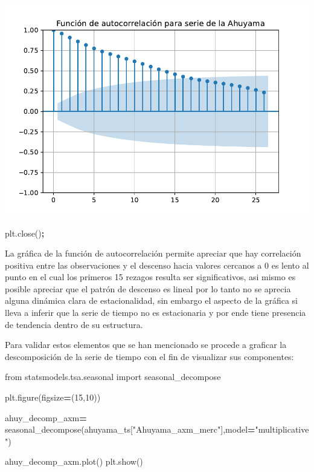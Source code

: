 \documentclass[
]{book}
\newenvironment{Shaded}{\begin{snugshade}}{\end{snugshade}}
\newcommand{\DecValTok}[1]{\textcolor[rgb]{0.00,0.00,0.81}{#1}}
\newcommand{\ImportTok}[1]{#1}
\newcommand{\NormalTok}[1]{#1}
\newcommand{\OperatorTok}[1]{\textcolor[rgb]{0.81,0.36,0.00}{\textbf{#1}}}
\newcommand{\StringTok}[1]{\textcolor[rgb]{0.31,0.60,0.02}{#1}}
\begin{document}
\includegraphics{bookdown-demo_files/figure-latex/unnamed-chunk-47-5.pdf}

\begin{Shaded}
\begin{Highlighting}[]
\NormalTok{plt.close()}\OperatorTok{;}
\end{Highlighting}
\end{Shaded}

La gráfica de la función de autocorrelación permite apreciar que hay correlación positiva entre las observaciones y el descenso hacia valores cercanos a 0 es lento al punto en el cual los primeros 15 rezagos resulta ser significativos, asi mismo es posible apreciar que el patrón de descenso es lineal por lo tanto no se aprecia alguna dinámica clara de estacionalidad, sin embargo el aspecto de la gráfica si lleva a inferir que la serie de tiempo no es estacionaria y por ende tiene presencia de tendencia dentro de su estructura.

Para validar estos elementos que se han mencionado se procede a graficar la descomposición de la serie de tiempo con el fin de visualizar sus componentes:

\begin{Shaded}
\begin{Highlighting}[]
 
\ImportTok{from}\NormalTok{ statsmodels.tsa.seasonal }\ImportTok{import}\NormalTok{ seasonal\_decompose}

\NormalTok{plt.figure(figsize}\OperatorTok{=}\NormalTok{(}\DecValTok{15}\NormalTok{,}\DecValTok{10}\NormalTok{))}

\NormalTok{ahuy\_decomp\_axm}\OperatorTok{=}\NormalTok{ seasonal\_decompose(ahuyama\_ts[}\StringTok{"Ahuyama\_axm\_merc"}\NormalTok{],model}\OperatorTok{=}\StringTok{"multiplicative"}\NormalTok{)}

\NormalTok{ahuy\_decomp\_axm.plot()}
\NormalTok{plt.show()}
\end{Highlighting}
\end{Shaded}
\end{document}

